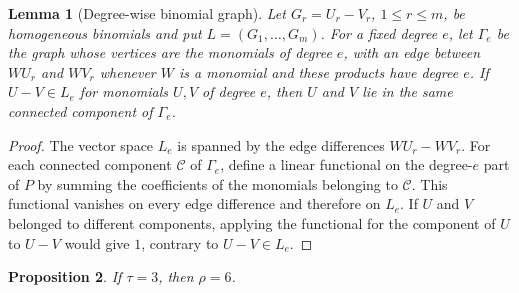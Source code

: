 \documentclass[10pt]{amsart}
\theoremstyle{plain}
\newtheorem{lemma}{Lemma}[section]
\newtheorem{proposition}[lemma]{Proposition}
\begin{document}
\begin{lemma}[Degree-wise binomial graph]
\label{lem:binomial-graph}
Let
\(G_r=U_r-V_r\), \(1\le r\le m\), be homogeneous binomials and put
\(L=(G_1,\ldots,G_m)\).  For a fixed degree \(e\), let
\(\Gamma_e\) be the graph whose vertices are the monomials of degree
\(e\), with an edge between \(WU_r\) and \(WV_r\) whenever \(W\) is
a monomial and these products have degree \(e\).  If
\(U-V\in L_e\) for monomials \(U,V\) of degree \(e\), then \(U\)
and \(V\) lie in the same connected component of \(\Gamma_e\).
\end{lemma}

\begin{proof}
The vector space \(L_e\) is spanned by the edge differences
\(WU_r-WV_r\).  For each connected component \(\mathcal C\) of
\(\Gamma_e\), define a linear functional on the degree-\(e\) part of
\(P\) by summing the coefficients of the monomials belonging to
\(\mathcal C\).  This functional vanishes on every edge difference and
therefore on \(L_e\).  If \(U\) and \(V\) belonged to different
components, applying the functional for the component of \(U\) to
\(U-V\) would give \(1\), contrary to \(U-V\in L_e\).
\end{proof}

\begin{proposition}\label{prop:type3}
If \(\tau=3\), then \(\rho=6\).
\end{proposition}
\end{document}
